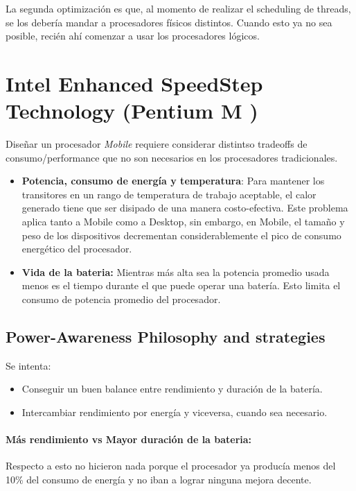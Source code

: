La segunda optimización es que, al momento de realizar el scheduling de threads, se los debería mandar a procesadores físicos distintos. Cuando esto ya no sea posible, recién ahí comenzar a usar los procesadores lógicos.

\newpage
\section{Intel Enhanced SpeedStep Technology (Pentium M \cite{Gochman2003TheIP})}

Diseñar un procesador \textit{Mobile} requiere considerar distintso tradeoffs de consumo/performance que no son necesarios en los procesadores tradicionales.

\begin{itemize}
	\item \textbf{Potencia, consumo de energía y temperatura}: Para mantener los transitores en un rango de temperatura de trabajo aceptable, el calor generado tiene que ser disipado de una manera costo-efectiva. Este problema aplica tanto a Mobile como a Desktop, sin embargo, en Mobile, el tamaño y peso de los dispositivos decrementan considerablemente el pico de consumo energético del procesador.

	\item \textbf{Vida de la bateria:} Mientras más alta sea la potencia promedio usada menos es el tiempo durante el que puede operar una batería. Esto limita el consumo de potencia promedio del procesador.
\end{itemize}

\subsection{Power-Awareness Philosophy and strategies}
Se intenta: 
\begin{itemize}
	\item Conseguir un buen balance entre rendimiento y duración de la batería.
	\item Intercambiar rendimiento por energía y viceversa, cuando sea necesario.
\end{itemize}

\paragraph{Más rendimiento vs Mayor duración de la bateria:} Respecto a esto no hicieron nada porque el procesador ya producía menos del 10\% del consumo de energía y no iban a lograr ninguna mejora decente.

